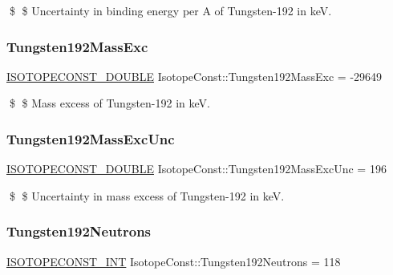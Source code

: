 \$ \$ Uncertainty in binding energy per A of Tungsten-\/192 in keV. \mbox{\label{group___isotope_const-_tungsten-_w192_ga8fe66953568df277359139813ee75b11}} 
\subsubsection{\texorpdfstring{Tungsten192\+Mass\+Exc}{Tungsten192MassExc}}
{\footnotesize\ttfamily \mbox{\hyperlink{group___isotope_const-_macros_ga8f45a7272ce02c0b4c65c44636ed719a}{I\+S\+O\+T\+O\+P\+E\+C\+O\+N\+S\+T\+\_\+\+D\+O\+U\+B\+LE}} Isotope\+Const\+::\+Tungsten192\+Mass\+Exc = -\/29649}

\$ \$ Mass excess of Tungsten-\/192 in keV. \mbox{\label{group___isotope_const-_tungsten-_w192_ga73d6c0feac66946d61d54b92c8633a74}} 
\subsubsection{\texorpdfstring{Tungsten192\+Mass\+Exc\+Unc}{Tungsten192MassExcUnc}}
{\footnotesize\ttfamily \mbox{\hyperlink{group___isotope_const-_macros_ga8f45a7272ce02c0b4c65c44636ed719a}{I\+S\+O\+T\+O\+P\+E\+C\+O\+N\+S\+T\+\_\+\+D\+O\+U\+B\+LE}} Isotope\+Const\+::\+Tungsten192\+Mass\+Exc\+Unc = 196}

\$ \$ Uncertainty in mass excess of Tungsten-\/192 in keV. \mbox{\label{group___isotope_const-_tungsten-_w192_gac4142d00867c27645ac32066b79fda33}} 
\subsubsection{\texorpdfstring{Tungsten192\+Neutrons}{Tungsten192Neutrons}}
{\footnotesize\ttfamily \mbox{\hyperlink{group___isotope_const-_macros_ga5f18360b3e99483a35c32d789e62621c}{I\+S\+O\+T\+O\+P\+E\+C\+O\+N\+S\+T\+\_\+\+I\+NT}} Isotope\+Const\+::\+Tungsten192\+Neutrons = 118}

